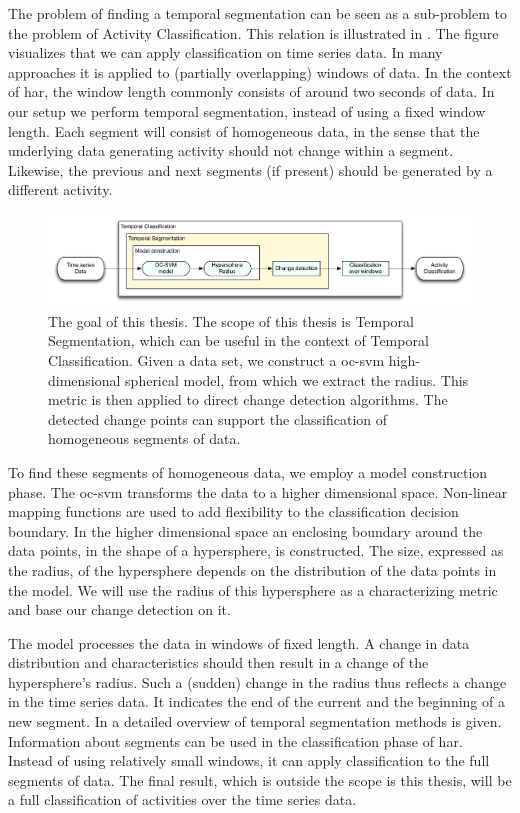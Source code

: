 The problem of finding a temporal segmentation can be seen as a sub-problem to the problem of Activity Classification.
This relation is illustrated in .
The figure visualizes that we can apply classification on time series data.
In many approaches it is applied to (partially overlapping) windows of data.
In the context of \gls{har}, the window length commonly consists of around two seconds of data.
In our setup we perform temporal segmentation, instead of using a fixed window length.
Each segment will consist of homogeneous data, in the sense that the underlying data generating activity should not change within a segment.
Likewise, the previous and next segments (if present) should be generated by a different activity.

\begin{figure}[h]
  \centering
    \includegraphics[width=\textwidth,height=\textheight,keepaspectratio]{./Figures/chapter1/thesis_goal.pdf}
  \caption[Thesis goal]{The goal of this thesis. The scope of this thesis is Temporal Segmentation, which can be useful in the context of Temporal Classification. Given a data set, we construct a \gls{oc-svm} high-dimensional spherical model, from which we extract the radius. This metric is then applied to direct change detection algorithms. The detected change points can support the classification of homogeneous segments of data.}
  \label{fig:thesis_goal}
\end{figure}

To find these segments of homogeneous data, we employ a model construction phase.
The \acrlong{oc-svm} transforms the data to a higher dimensional space.
Non-linear mapping functions are used to add flexibility to the classification decision boundary.
In the higher dimensional space an enclosing boundary around the data points, in the shape of a hypersphere, is constructed.
The size, expressed as the radius, of the hypersphere depends on the distribution of the data points in the model.
We will use the radius of this hypersphere as a characterizing metric and base our change detection on it.

The model processes the data in windows of fixed length.
A change in data distribution and characteristics should then result in a change of the hypersphere's radius.
Such a (sudden) change in the radius thus reflects a change in the time series data.
It indicates the end of the current and the beginning of a new segment.
In  a detailed overview of temporal segmentation methods is given.
Information about segments can be used in the classification phase of \gls{har}.
Instead of using relatively small windows, it can apply classification to the full segments of data.
The final result, which is outside the scope is this thesis, will be a full classification of activities over the time series data.

